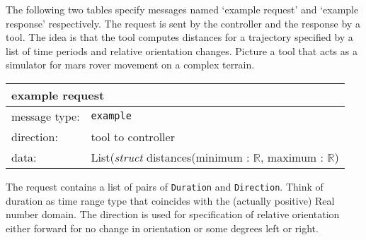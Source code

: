 \documentclass{article}
\newcommand{\msg}[1]{\texttt{#1}}
\newcommand{\Id}{\texttt{ID}\xspace}
\begin{document}
   
   The following two tables specify messages named `example request' and
   `example response' respectively. The request is sent by the controller and
   the response by a tool. The idea is that the tool computes distances for a
   trajectory specified by a list of time periods and relative orientation
   changes. Picture a tool that acts as a simulator for mars rover movement on
   a complex terrain.

   \begin{table}[H]
    \begin{center}
     \begin{tabular}{|ll|}
      \hline
       \multicolumn{2}{|l|}{\textbf{example request}} \\
      \hline
       message type:    & \msg{example} \\
      \hline
       direction:       & tool to controller \\
       data:            & List(\textit{struct } distances(minimum : $\mathbb{R}$, maximum : $\mathbb{R}$) \\
      \hline
     \end{tabular}
    \end{center}
    \vspace{-0.5cm}
   \end{table}

   \noindent The request contains a list of pairs of \texttt{Duration} and
   \texttt{Direction}. Think of duration as time range type that coincides
   with the (actually positive) Real number domain. The direction is used for
   specification of relative orientation either forward for no change in
   orientation or some degrees left or right.
\end{document}
